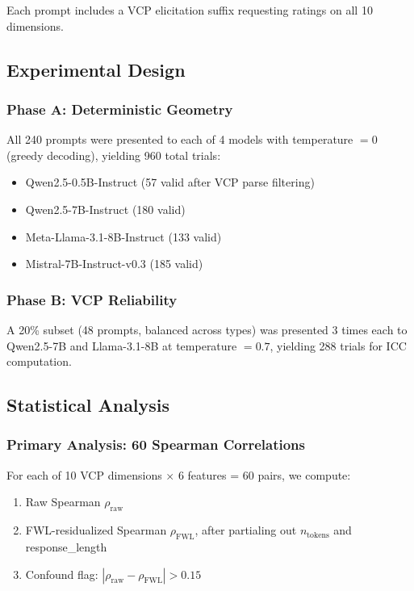 \documentclass[11pt,a4paper]{article}
\begin{document}
Each prompt includes a VCP elicitation suffix requesting ratings on all 10 dimensions.

\subsection{Experimental Design}

\subsubsection{Phase A: Deterministic Geometry}

All 240 prompts were presented to each of 4 models with temperature $= 0$ (greedy decoding), yielding 960 total trials:

\begin{itemize}
    \item Qwen2.5-0.5B-Instruct (57 valid after VCP parse filtering)
    \item Qwen2.5-7B-Instruct (180 valid)
    \item Meta-Llama-3.1-8B-Instruct (133 valid)
    \item Mistral-7B-Instruct-v0.3 (185 valid)
\end{itemize}

\subsubsection{Phase B: VCP Reliability}

A 20\% subset (48 prompts, balanced across types) was presented 3 times each to Qwen2.5-7B and Llama-3.1-8B at temperature $= 0.7$, yielding 288 trials for ICC computation.

\subsection{Statistical Analysis}

\subsubsection{Primary Analysis: 60 Spearman Correlations}

For each of 10 VCP dimensions $\times$ 6 features = 60 pairs, we compute:
\begin{enumerate}
    \item Raw Spearman $\rho_{\text{raw}}$
    \item FWL-residualized Spearman $\rho_{\text{FWL}}$, after partialing out $n_{\text{tokens}}$ and response\_length
    \item Confound flag: $|\rho_{\text{raw}} - \rho_{\text{FWL}}| > 0.15$
\end{enumerate}
\end{document}
